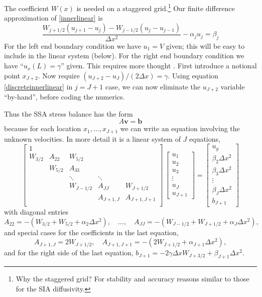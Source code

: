 \documentclass[titlepage,letterpaper,final,12pt]{scrartcl}
\begin{document}
The coefficient $W(x)$ is needed on a staggered grid.\footnote{Why the staggered grid?  For stability and accuracy reasons similar to those for the SIA diffusivity.}  Our finite difference approximation of \eqref{innerlinear} is
\begin{equation}
  \frac{W_{j+1/2} (u_{j+1} - u_j) - W_{j-1/2} (u_{j} - u_{j-1})}{\Delta x^2} - \alpha_j u_j = \beta_j  \label{discreteinnerlinear}
\end{equation}
For the left end boundary condition we have $u_1 = V$ given; this will be easy to include in the linear system (below).  For the right end boundary condition we have ``$u_x(L)=\gamma$'' given.  This requires more thought \cite{MortonMayers}.  First introduce a notional point $x_{J+2}$.  Now require $(u_{J+2} - u_J)/(2 \Delta x) = \gamma$.  Using equation \eqref{discreteinnerlinear} in $j=J+1$ case, we can now eliminate the $u_{J+2}$ variable ``by-hand'', before coding the numerics.

Thus the SSA stress balance has the form
  $$A \mathbf{v} = \mathbf{b}$$
because for each location $x_1,\dots,x_{J+1}$ we can write an equation involving the unknown velocities.  In more detail it is a linear system of $J$ equations,
\begin{equation}
\begin{bmatrix}
1 &  &  &  &  \\
W_{3/2} & A_{22} & W_{5/2} &  &  \\
 & W_{5/2} & A_{33} &  &  \\
 &  & \ddots & \ddots &  \\
 &  & W_{J-1/2} & A_{JJ} & W_{J+1/2} \\
 &  &  & A_{J+1,J} & A_{J+1,J+1} \\
\end{bmatrix}\,
\begin{bmatrix}
u_1 \\ u_2 \\ u_3 \\ \vdots \\ u_J \\ u_{J+1}
\end{bmatrix}
=
\begin{bmatrix}
u_g \\ \beta_2 \Delta x^2 \\ \beta_3 \Delta x^2 \\ \vdots \\ \beta_J \Delta x^2 \\ b_{J+1}
\end{bmatrix}  \label{discretematrixform}
\end{equation}
with diagonal entries
  $$A_{22} = -(W_{3/2}+W_{5/2}+\alpha_2 \Delta x^2), \quad \dots, \quad A_{JJ} = -(W_{J-1/2}+W_{J+1/2}+\alpha_J \Delta x^2),$$
and special cases for the coefficients in the last equation,
  $$A_{J+1,J} = 2 W_{J+1/2}, \quad A_{J+1,J+1} = -(2 W_{J+1/2}+\alpha_{J+1}\Delta x^2),$$
and for the right side of the last equation, $b_{J+1} = -2 \gamma \Delta x W_{J+3/2} + \beta_{J+1} \Delta x^2$.
\end{document}
